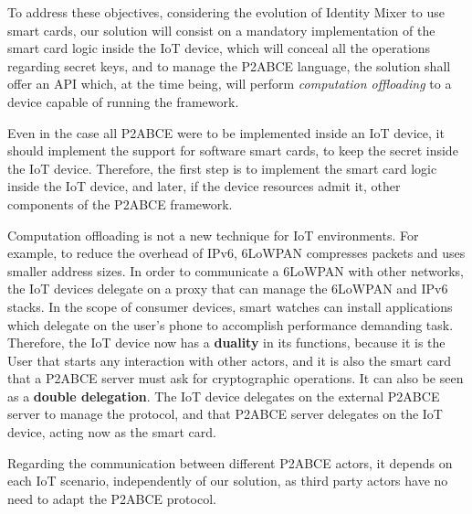 \hfil

To address these objectives, considering the evolution of Identity Mixer to use smart cards, our solution will consist on a mandatory implementation of the smart card logic inside the IoT device, which will conceal all the operations regarding secret keys, and to manage the P2ABCE language, the solution shall offer an API which, at the time being, will perform \textit{computation offloading} to a device capable of running the framework.

Even in the case all P2ABCE were to be implemented inside an IoT device, it should implement the support for software smart cards, to keep the secret inside the IoT device. Therefore, the first step is to implement the smart card logic inside the IoT device, and later, if the device resources admit it, other components of the P2ABCE framework.

Computation offloading is not a new technique for IoT environments. For example, to reduce the overhead of IPv6, 6LoWPAN compresses packets and uses smaller address sizes. In order to communicate a 6LoWPAN with other networks, the IoT devices delegate on a proxy that can manage the 6LoWPAN and IPv6 stacks. In the scope of consumer devices, smart watches can install applications which delegate on the user's phone to accomplish performance demanding task. 
Therefore, the IoT device now has a \textbf{duality} in its functions, because it is the User that starts any interaction with other actors, and it is also the smart card that a P2ABCE server must ask for cryptographic operations. It can also be seen as a \textbf{double delegation}. The IoT device delegates on the external P2ABCE server to manage the protocol, and that P2ABCE server delegates on the IoT device, acting now as the smart card.

Regarding the communication between different P2ABCE actors, it depends on each IoT scenario, independently of our solution, as third party actors have no need to adapt the P2ABCE protocol.




